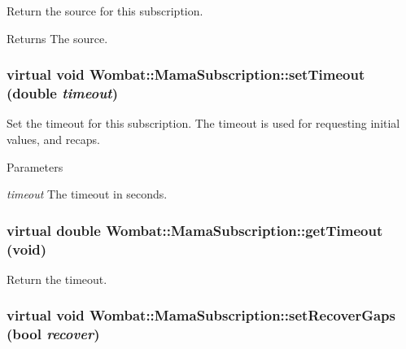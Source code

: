 Return the source for this subscription. \begin{DoxyReturn}{Returns}
The source. 
\end{DoxyReturn}
\hypertarget{classWombat_1_1MamaSubscription_a6e29abd97a8821db4b0d2af7989d8549}{
\subsubsection[{setTimeout}]{\setlength{\rightskip}{0pt plus 5cm}virtual void Wombat::MamaSubscription::setTimeout (double {\em timeout})}}
\label{classWombat_1_1MamaSubscription_a6e29abd97a8821db4b0d2af7989d8549}


Set the timeout for this subscription. The timeout is used for requesting initial values, and recaps.


\begin{DoxyParams}{Parameters}
\item[{\em timeout}]The timeout in seconds. \end{DoxyParams}
\hypertarget{classWombat_1_1MamaSubscription_a921e36bfd97a95056519c98c5c4d5947}{
\subsubsection[{getTimeout}]{\setlength{\rightskip}{0pt plus 5cm}virtual double Wombat::MamaSubscription::getTimeout (void)}}
\label{classWombat_1_1MamaSubscription_a921e36bfd97a95056519c98c5c4d5947}


Return the timeout. \hypertarget{classWombat_1_1MamaSubscription_a4535b3a2b9db7ccdb96571b085eb7ccc}{
\subsubsection[{setRecoverGaps}]{\setlength{\rightskip}{0pt plus 5cm}virtual void Wombat::MamaSubscription::setRecoverGaps (bool {\em recover})}}
\label{classWombat_1_1MamaSubscription_a4535b3a2b9db7ccdb96571b085eb7ccc}


